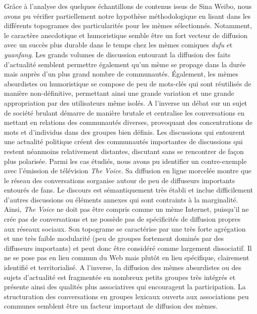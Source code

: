 Gr\^ace \`a l{\textquoteright}analyse des quelques \'echantillons de contenus issus de Sina Weibo, nous avons pu v\'erifier partiellement notre hypoth\`ese m\'ethodologique en lisant dans les diff\'erents topogrames des particularit\'es pour les m\`emes s\'electionn\'es. Notamment, le caract\`ere anecdotique et humoristique semble \^etre un fort vecteur de diffusion avec un succ\`es plus durable dans le temps chez les m\`emes comiques \textit{dufu} et \textit{yuanfang}. Les grands volumes de discussion entourant la diffusion des faits d{\textquoteright}actualit\'e semblent permettre \'egalement qu{\textquoteright}un m\`eme se propage dans la dur\'ee mais aupr\`es d{\textquoteright}un plus grand nombre de communaut\'es. \'Egalement, les m\`emes absurdistes ou humoristique se compose de peu de mots-cl\'es qui sont r\'eutilis\'es de mani\`ere non-d\'efinitive, permettant ainsi une grande variation et une grande appropriation par des utilisateurs m\^eme isol\'es. A l{\textquoteright}inverse un d\'ebat sur un sujet de soci\'et\'e brulant d\'emarre de mani\`ere brutale et centralise les conversations en mettant en relations des communaut\'es diverses, provoquant des concentrations de mots et d{\textquoteright}individus dans des groupes bien d\'efinis. Les discussions qui entourent une actualit\'e politique cr\'eent des communaut\'es importantes de discussions qui restent n\'eanmoins relativement distantes, discutant sans se rencontrer de fa\c{c}on plus polaris\'ee. Parmi les cas \'etudi\'es, nous avons pu identifier un contre-exemple avec l{\textquoteright}\'emission de t\'el\'evision \textit{The Voice}\textit{. }Sa diffusion en ligne morcel\'ee montre que le r\'eseau des conversations s{\textquotesingle}organise autour de peu de diffuseurs importants entour\'es de fans. Le discours est s\'emantiquement tr\`es \'etabli et inclue difficilement d{\textquoteright}autres discussions ou \'el\'ements annexes qui sont contraints \`a la marginalit\'e. Ainsi, \textit{The Voice }ne doit pas \^etre compris comme un m\`eme Internet, puisqu{\textquoteright}il ne cr\'ee pas de conversations et ne poss\`ede pas de sp\'ecificit\'es de diffusion propres aux r\'eseaux sociaux. Son topograme se caract\'erise par une tr\`es forte agr\'egation et une tr\`es faible modularit\'e (peu de groupes fortement domin\'es par des diffuseurs importants) et peut donc \^etre consid\'er\'e comme largement dissociatif. Il ne se pose pas en lieu commun du Web mais plut\^ot en lieu sp\'ecifique, clairement identifi\'e et territorialis\'e. A l{\textquoteright}inverse, la diffusion des m\`emes absurdistes ou des sujets d{\textquoteright}actualit\'e est fragment\'ee en nombreux petits groupes tr\`es int\'egr\'es et pr\'esente ainsi des qualit\'es plus associatives qui encouragent la participation. La structuration des conversations en groupes lexicaux ouverts aux associations peu communes semblent \^etre un facteur important de diffusion des m\`emes.
 
